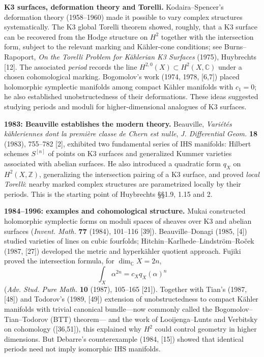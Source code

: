 \par\smallskip\noindent
\textbf{K3 surfaces, deformation theory and Torelli.}
Kodaira--Spencer's deformation theory (1958--1960)
made it possible to vary complex structures
systematically. The K3 global Torelli theorem
showed, roughly, that a K3 surface can be recovered
from the Hodge structure on $H^2$ together with the
intersection form, subject to the relevant marking
and K\"ahler-cone conditions; see Burns--Rapoport,
\emph{On the Torelli Problem for K\"ahlerian K3
Surfaces} (1975), Huybrechts [12].
The associated \emph{period} records the line
$H^{2,0}(X)\subset H^2(X,\mathbb C)$ under a
chosen cohomological marking.
Bogomolov's work (1974, 1978, [6,7])
placed holomorphic symplectic manifolds among
compact K\"ahler manifolds with $c_1=0$;
he also established unobstructedness of their
deformations.
These ideas suggested studying periods and moduli
for higher-dimensional analogues of K3 surfaces.

\par\smallskip\noindent
\textbf{1983: Beauville establishes the modern theory.}
Beauville, \emph{Vari\'et\'es k\"ahleriennes dont la
premi\`ere classe de Chern est nulle},
\emph{J. Differential Geom.} \textbf{18} (1983),
755--782 [2], exhibited two fundamental series
of IHS manifolds: Hilbert schemes $S^{[n]}$
of points on K3 surfaces and generalized Kummer
varieties associated with abelian surfaces.
He also introduced a quadratic form $q_X$
on $H^2(X,\mathbb Z)$, generalizing the
intersection pairing of a K3 surface, and
proved \emph{local Torelli}: nearby marked
complex structures are parametrized locally
by their periods. This is the starting point
of Huybrechts \S\S1.9, 1.15 and 2.

\par\smallskip\noindent
\textbf{1984--1996: examples and cohomological structure.}
Mukai constructed holomorphic symplectic forms
on moduli spaces of sheaves over K3 and abelian
surfaces (\emph{Invent. Math.} \textbf{77} (1984),
101--116 [39]). Beauville--Donagi (1985, [4])
studied varieties of lines on cubic fourfolds;
Hitchin--Karlhede--Lindstr\"om--Ro\v cek (1987,
[27]) developed the metric and hyperk\"ahler
quotient approach. Fujiki proved the
intersection formula, for $\dim_{\mathbb C}X=2n$,
\[
\int_X\alpha^{2n}=c_Xq_X(\alpha)^n
\]
(\emph{Adv. Stud. Pure Math.} \textbf{10}
(1987), 105--165 [21]). Together with
Tian's (1987, [48]) and Todorov's
(1989, [49]) extension of unobstructedness
to compact K\"ahler manifolds with trivial
canonical bundle---now commonly called the
Bogomolov--Tian--Todorov (BTT) theorem--- and the work of
Looijenga--Lunts and Verbitsky on cohomology
([36,51]), this explained why $H^2$ could
control geometry in higher dimensions.
But Debarre's counterexample (1984, [15])
showed that identical periods need not
imply isomorphic IHS manifolds.

